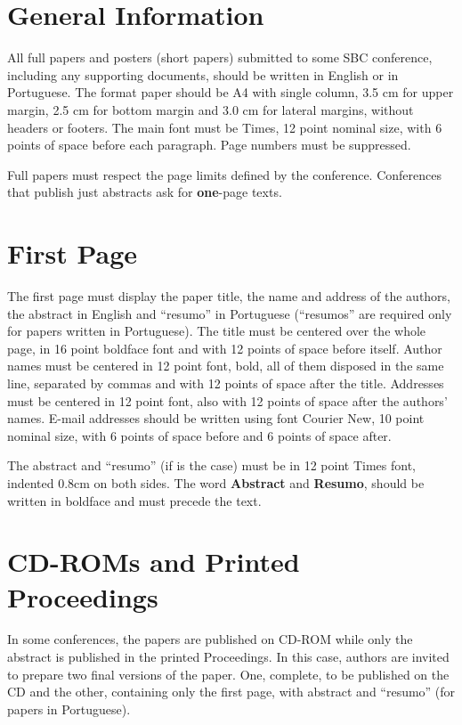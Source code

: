 \documentclass[12pt]{article}
\begin{document}

\section{General Information}

All full papers and posters (short papers) submitted to some SBC conference,
including any supporting documents, should be written in English or in
Portuguese. The format paper should be A4 with single column, 3.5 cm for upper
margin, 2.5 cm for bottom margin and 3.0 cm for lateral margins, without
headers or footers. The main font must be Times, 12 point nominal size, with 6
points of space before each paragraph. Page numbers must be suppressed.

Full papers must respect the page limits defined by the conference.
Conferences that publish just abstracts ask for \textbf{one}-page texts.

\section{First Page} \label{sec:firstpage}

The first page must display the paper title, the name and address of the
authors, the abstract in English and ``resumo'' in Portuguese (``resumos'' are
required only for papers written in Portuguese). The title must be centered
over the whole page, in 16 point boldface font and with 12 points of space
before itself. Author names must be centered in 12 point font, bold, all of
them disposed in the same line, separated by commas and with 12 points of
space after the title. Addresses must be centered in 12 point font, also with
12 points of space after the authors' names. E-mail addresses should be
written using font Courier New, 10 point nominal size, with 6 points of space
before and 6 points of space after.

The abstract and ``resumo'' (if is the case) must be in 12 point Times font,
indented 0.8cm on both sides. The word \textbf{Abstract} and \textbf{Resumo},
should be written in boldface and must precede the text.

\section{CD-ROMs and Printed Proceedings}

In some conferences, the papers are published on CD-ROM while only the
abstract is published in the printed Proceedings. In this case, authors are
invited to prepare two final versions of the paper. One, complete, to be
published on the CD and the other, containing only the first page, with
abstract and ``resumo'' (for papers in Portuguese).
\end{document}
